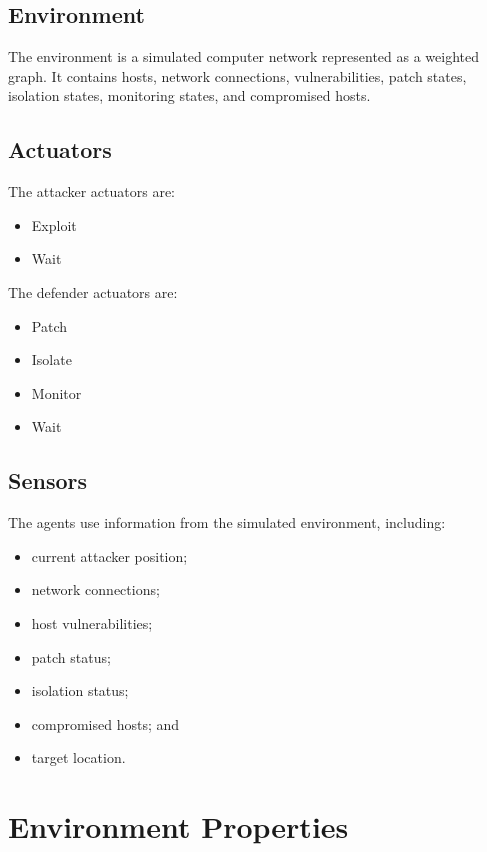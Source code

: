 \documentclass[12pt,a4paper]{article}
\begin{document}
\subsection{Environment}

The environment is a simulated computer network represented as a weighted
graph. It contains hosts, network connections, vulnerabilities, patch states,
isolation states, monitoring states, and compromised hosts.

\subsection{Actuators}

The attacker actuators are:

\begin{itemize}
    \item Exploit
    \item Wait
\end{itemize}

The defender actuators are:

\begin{itemize}
    \item Patch
    \item Isolate
    \item Monitor
    \item Wait
\end{itemize}

\subsection{Sensors}

The agents use information from the simulated environment, including:

\begin{itemize}
    \item current attacker position;
    \item network connections;
    \item host vulnerabilities;
    \item patch status;
    \item isolation status;
    \item compromised hosts; and
    \item target location.
\end{itemize}


\section{Environment Properties}
\end{document}
